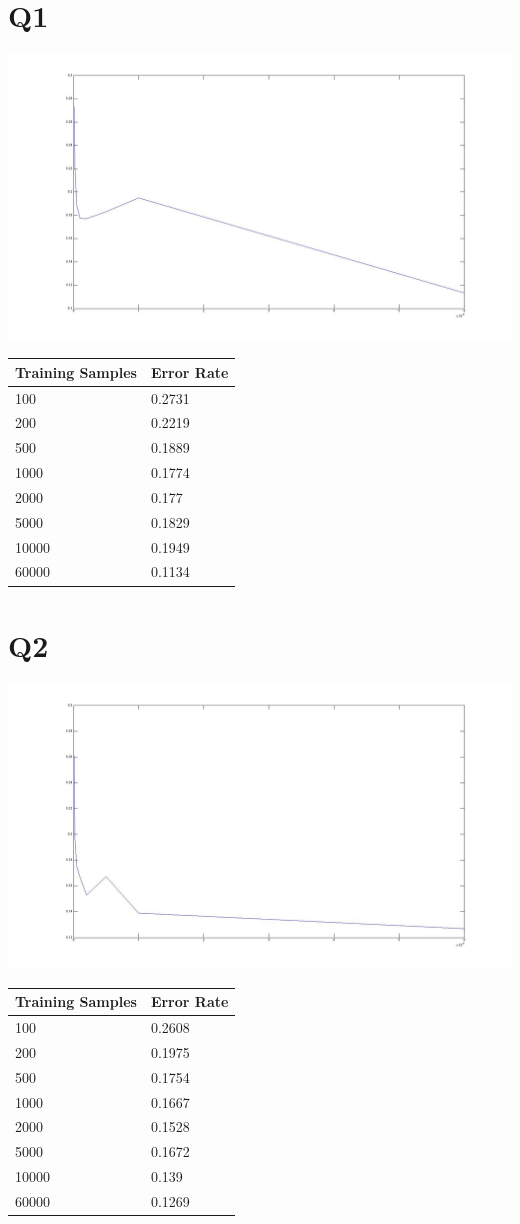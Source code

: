 \documentclass[12pt]{article}
\begin{document}
\section*{Q1}
  \includegraphics[scale=0.3]{q1_pixel_error.jpg}
  \begin{tabular}{l|l}
    \hline
    Training Samples & Error Rate \\
    \hline
    100   & 0.2731 \\
    200   & 0.2219 \\
    500   & 0.1889 \\
    1000  & 0.1774 \\
    2000  & 0.177  \\
    5000  & 0.1829 \\
    10000 & 0.1949 \\
    60000 & 0.1134 \\
  \end{tabular}
\newpage
\section*{Q2}
  \includegraphics[scale=0.3]{q2_full.jpg}
  \begin{tabular}{l|l}
    \hline
    Training Samples & Error Rate \\
    \hline
    100   & 0.2608 \\
    200   & 0.1975 \\
    500   & 0.1754 \\
    1000  & 0.1667 \\
    2000  & 0.1528 \\
    5000  & 0.1672 \\
    10000 & 0.139 \\
    60000 & 0.1269 \\
  \end{tabular}
\end{document}
